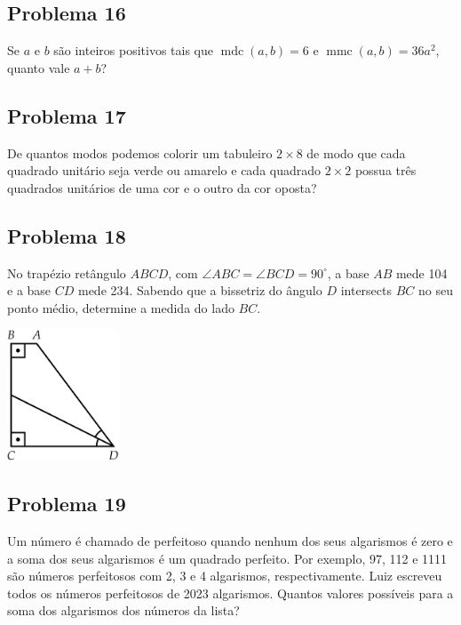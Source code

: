 \documentclass[12pt]{article}
\begin{document}
\clearpage

\subsection{Problema 16}
\begin{tcolorbox}[statementbox]
  Se \(a\) e \(b\) são inteiros positivos tais que \(\operatorname{mdc}(a,b) = 6\) e \(\operatorname{mmc}(a,b) = 36a^2\), quanto vale \(a+b\)?
\end{tcolorbox}

\clearpage

\subsection{Problema 17}
\begin{tcolorbox}[statementbox]
De quantos modos podemos colorir um tabuleiro \(2\times8\) de modo que cada quadrado unitário seja verde ou amarelo e cada 
quadrado \(2\times2\) possua três quadrados unitários de uma cor e o outro da cor oposta?
\end{tcolorbox}

\clearpage

\subsection{Problema 18}
\begin{tcolorbox}[statementbox]
No trapézio retângulo \(ABCD\), com \(\angle ABC = \angle BCD = 90^\circ\), a base \(AB\) mede 104 e a base \(CD\) mede 234.
Sabendo que a bissetriz do ângulo \(D\) intersects \(BC\) no seu ponto médio, determine a medida do lado \(BC\).
\begin{center}
  \includegraphics[width=0.25\textwidth]{third.png}
\end{center}
\end{tcolorbox}

\clearpage

\subsection{Problema 19}
\begin{tcolorbox}[statementbox]
Um número é chamado de perfeitoso quando nenhum dos seus algarismos é zero e a soma dos seus algarismos é um quadrado perfeito.
Por exemplo, 97, 112 e 1111 são números perfeitosos com 2, 3 e 4 algarismos, respectivamente. Luiz escreveu todos os números 
perfeitosos de 2023 algarismos. Quantos valores possíveis para a soma dos algarismos dos números da lista?
\end{tcolorbox}
\end{document}
